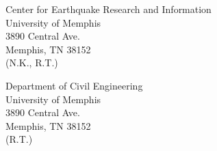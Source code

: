 
\vspace{4ex}

\noindent
Center for Earthquake Research and Information\\
University of Memphis\\
3890 Central Ave.\\
Memphis, TN 38152\\
\indent(N.K., R.T.)

\vspace{2ex}

\noindent
Department of Civil Engineering\\
University of Memphis\\
3890 Central Ave.\\
Memphis, TN 38152\\
\indent(R.T.)
